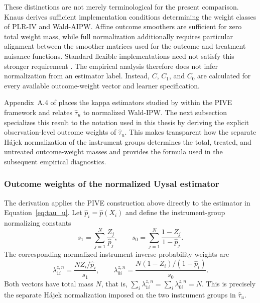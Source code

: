 \documentclass[12pt, a4paper, oneside]{article}
\theoremstyle{plain}
\theoremstyle{definition}
\begin{document}
These distinctions are not merely terminological for the present comparison.
Knaus derives sufficient implementation conditions determining the weight
classes of PLR-IV and Wald-AIPW. Affine outcome smoothers are sufficient for
zero total weight mass, while full normalization additionally requires
particular alignment between the smoother matrices used for the outcome and
treatment nuisance functions. Standard flexible implementations need not
satisfy this stronger requirement
\citep[Sections~4.2.2 and 4.2.4]{knaus2024treatment}. The empirical analysis
therefore does not infer normalization from an estimator label. Instead,
\(C\), \(C_1\), and \(C_0\) are calculated for every available outcome-weight
vector and learner specification.

Appendix~A.4 of \citet{knaus2024treatment} places the kappa estimators studied
by \citet{sloczynski2025abadie} within the PIVE framework and relates
\(\widehat{\tau}_u\) to normalized Wald-IPW. The next subsection specializes
this result to the notation used in this thesis by deriving the explicit
observation-level outcome weights of \(\widehat{\tau}_u\). This makes
transparent how the separate H\'ajek normalization of the instrument groups
determines the total, treated, and untreated outcome-weight masses and provides
the formula used in the subsequent empirical diagnostics.




\subsubsection{Outcome weights of the normalized Uysal estimator}
\label{subsec:omega_u}

The derivation applies the PIVE construction above directly to the estimator in
Equation~\eqref{eq:tau_u}. Let \(\widehat p_i=\widehat p(X_i)\) and define the
instrument-group normalizing constants
\begin{equation}
    s_1=\sum_{j=1}^{N}\frac{Z_j}{\widehat p_j},
    \qquad
    s_0=\sum_{j=1}^{N}\frac{1-Z_j}{1-\widehat p_j}.
    \label{eq:u_s1_s0}
\end{equation}
The corresponding normalized instrument inverse-probability weights are
\begin{equation}
    \lambda_{1i}^{z,n}
    =\frac{N Z_i/\widehat p_i}{s_1},
    \qquad
    \lambda_{0i}^{z,n}
    =\frac{N(1-Z_i)/(1-\widehat p_i)}{s_0}.
    \label{eq:u_norm_lambda}
\end{equation}
Both vectors have total mass \(N\), that is,
\(\sum_i\lambda_{1i}^{z,n}=\sum_i\lambda_{0i}^{z,n}=N\). This is precisely
the separate H\'ajek normalization imposed on the two instrument groups in
\(\widehat\tau_u\).
\end{document}
